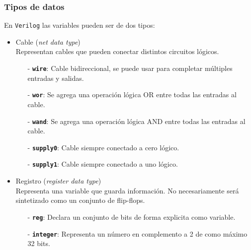 \documentclass[aspectratio=169]{beamer}
\begin{document}
\begin{frame}[fragile,t]
    \frametitle{Tipos de datos}
    En \texttt{Verilog} las variables pueden ser de dos tipos:
    \begin{itemize}
     \item<2->[-] \textcolor{naranjauca}{Cable} (\emph{net data type})\\
     Representan cables que pueden conectar distintos circuitos lógicos.
     \vspace{0.2cm}
    \begin{itemize}
     \item[-] \textbf{\texttt{wire}}: Cable bidireccional, se puede usar para completar múltiples entradas y salidas.
     \item[-] \textbf{\texttt{wor}}: Se agrega una operación lógica OR entre todas las entradas al cable.
     \item[-] \textbf{\texttt{wand}}: Se agrega una operación lógica AND entre todas las entradas al cable.
     \item[-] \textbf{\texttt{supply0}}: Cable siempre conectado a cero lógico.
     \item[-] \textbf{\texttt{supply1}}: Cable siempre conectado a uno lógico.
    \end{itemize}
    \vspace{0.2cm}
     \item<3->[-] \textcolor{naranjauca}{Registro} (\emph{register data type})\\
     Representa una variable que guarda información. No necesariamente será sintetizado como un conjunto de flip-flops.
     \vspace{0.2cm}
    \begin{itemize}
     \item[-] \textbf{\texttt{reg}}: Declara un conjunto de bits de forma explicita como variable.
     \item[-] \textbf{\texttt{integer}}: Representa un número en complemento a 2 de como máximo 32 bits.
    \end{itemize}
    \vspace{0.2cm}
    \end{itemize}
\end{frame}
\end{document}
